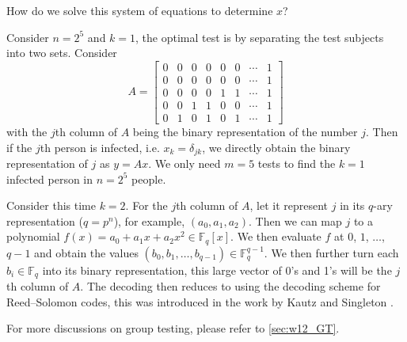 How do we solve this system of equations to determine $x$?
\begin{example}
    Consider $n=2^5$ and $k=1$, the optimal test is by separating the test subjects into two sets. Consider
    \begin{equation*}
        A = \left[\begin{matrix}
            0 & 0 & 0 & 0 & 0 & 0 & \cdots & 1 \\
            0 & 0 & 0 & 0 & 0 & 0 & \cdots & 1 \\
            0 & 0 & 0 & 0 & 1 & 1 & \cdots & 1 \\
            0 & 0 & 1 & 1 & 0 & 0 & \cdots & 1 \\
            0 & 1 & 0 & 1 & 0 & 1 & \cdots & 1 
        \end{matrix}\right]
    \end{equation*}
    with the $j$th column of $A$ being the binary representation of the number $j$. Then if the $j$th person is infected, i.e. $x_k = \delta_{jk}$, we directly obtain the binary representation of $j$ as $y=Ax$. We only need $m=5$ tests to find the $k=1$ infected person in $n=2^5$ people.
\end{example}

\begin{example}
    \color{red}
    Consider this time $k=2$. For the $j$th column of $A$, let it represent $j$ in its $q$-ary representation ($q=p^n$), for example, $(a_0,a_1,a_2)$. Then we can map $j$ to a polynomial $f(x) = a_0 + a_1x + a_2x^2\in\mathbb{F}_q[x]$. We then evaluate $f$ at $0$, $1$, $\ldots$, $q-1$ and obtain the values $(b_0,b_1,\ldots,b_{q-1})\in\mathbb{F}_q^{q-1}$. We then further turn each $b_i\in\mathbb{F}_q$ into its binary representation, this large vector of 0's and 1's will be the $j$th column of $A$. The decoding then reduces to using the decoding scheme for Reed--Solomon codes, this was introduced in the work by Kautz and Singleton \cite{Kautz_Singleton_64}.
\end{example}




For more discussions on group testing, please refer to \autoref{sec:w12_GT}.